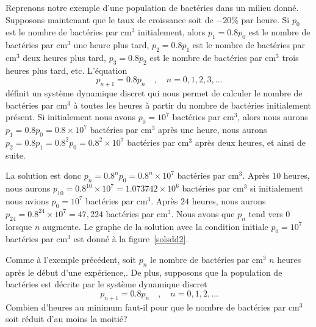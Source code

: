{

\begin{egg}
Reprenons notre exemple d'une population de bactéries dans un milieu
donné. Supposons maintenant que le taux de croissance soit de $-20$\%
par heure.  Si $p_0$ est le nombre de bactéries par cm$^3$
initialement, alors $p_1 = 0.8 p_0$ est le nombre de bactéries par
cm$^3$ une heure plus tard, $p_2 = 0.8 p_1$ est le nombre de bactéries
par cm$^3$ deux heures plus tard, $p_3 = 0.8 p_2$ est le nombre de
bactéries par cm$^3$ trois heures plus tard, etc.  L'équation 
\[
p_{n+1} = 0.8 p_n \quad , \quad n=0,1,2,3,\ldots
\]
définit un système dynamique discret qui nous permet de calculer le
nombre de bactéries par cm$^3$ à toutes les heures à partir du nombre
de bactéries initialement présent.  Si initialement nous avons $p_0 = 10^7$
bactéries par cm$^3$, alors nous aurons $p_1 = 0.8 p_0 = 0.8 \times 10^7$
bactéries par cm$^3$ après une heure, nous aurons
$p_2 = 0.8 p_1 = 0.8^2 p_0 = 0.8^2 \times 10^7$ bactéries par cm$^3$
après deux heures, et ainsi de suite.

La solution est donc $p_n = 0.8^n p_0 = 0.8^n \times 10^7$ bactéries
par cm$^3$.  Après $10$ heures, nous aurons
$p_{10} = 0.8^{10}\times 10^7 = 1.073742\times 10^6$
bactéries par cm$^3$ si initialement nous avions $p_0 = 10^7$ bactéries
par cm$^3$.  Après $24$ heures, nous aurons
$p_{24} = 0.8^{24}\times 10^7 = 47,224$ bactéries par cm$^3$.  Nous avons
que $p_n$ tend vers $0$ lorsque $n$ augmente.  Le graphe de
la solution avec la condition initiale $p_0 = 10^7$ bactéries par
cm$^3$ est donné à la figure~\ref{solsdd2}.
\label{sdd_egg2}
\end{egg}


\begin{egg}
Comme à l'exemple précédent, soit $p_n$ le nombre de bactéries par
cm$^3$ $n$ heures après le début d'une expérience,.  De plus,
supposons que la population de bactéries est décrite par le système
dynamique discret
\[
p_{n+1} = 0.8 p_n \quad , \quad n=0, 1, 2, \ldots
\]
Combien d'heures au minimum faut-il pour que le nombre de bactéries
par cm$^3$ soit réduit d'au moins la moitié?


\end{egg}}
